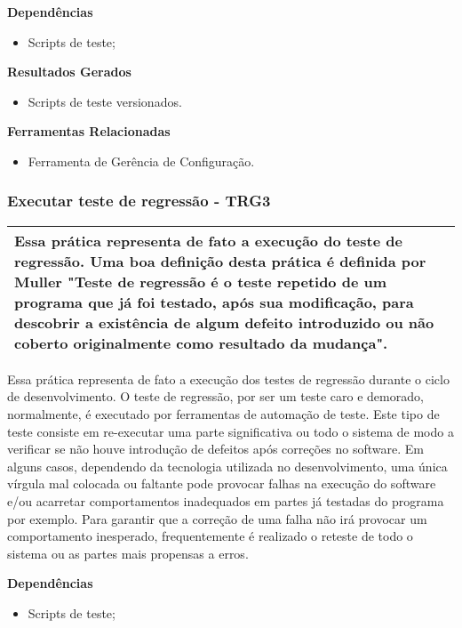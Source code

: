 \textbf{Dependências}
\begin{itemize}
    \item Scripts de teste;
\end{itemize}

\textbf{Resultados Gerados}
\begin{itemize}
    \item Scripts de teste versionados.
\end{itemize}

\textbf{Ferramentas Relacionadas}
\begin{itemize}
    \item Ferramenta de Gerência de Configuração.
\end{itemize}

\subsubsection{Executar teste de regressão - TRG3}
\label{sec:trg3}

\begin{table}[H]
\centering
\begin{tabular}{|p{130mm}|}
\hline
Essa prática representa de fato a execução do teste de regressão. Uma boa definição desta prática é definida por Muller \cite{muller2011} "Teste de regressão é o teste repetido de um programa que já foi testado, após sua modificação, para descobrir a existência de algum defeito introduzido ou não coberto originalmente como resultado da mudança".  \\
\hline
\end{tabular}
\end{table}

Essa prática representa de fato a execução dos testes de regressão durante o ciclo de desenvolvimento. O teste de regressão, por ser um teste caro e demorado, normalmente, é executado por ferramentas de automação de teste. Este tipo de teste consiste em re-executar uma parte significativa ou todo o sistema de modo a verificar se não houve introdução de defeitos após correções no software. Em alguns casos, dependendo da tecnologia utilizada no desenvolvimento, uma única vírgula mal colocada ou faltante pode provocar falhas na execução do software e/ou acarretar comportamentos inadequados em partes já testadas do programa por exemplo. Para garantir que a correção de uma falha não irá provocar um comportamento inesperado, frequentemente é realizado o reteste de todo o sistema ou as partes mais propensas a erros.


\textbf{Dependências}
\begin{itemize}
    \item Scripts de teste;
\end{itemize}

